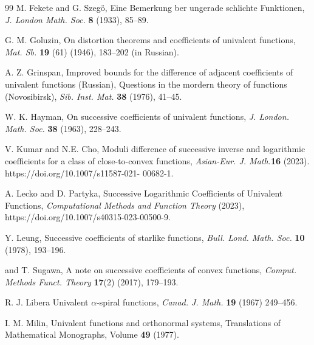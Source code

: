\documentclass[a4paper,12pt]{amsart}
\theoremstyle{definition}
\numberwithin{equation}{section}
\begin{document}
\begin{thebibliography}{99}
 {\sc  M. Fekete} and {\sc G. Szegö},
{Eine Bemerkung ber ungerade schlichte Funktionen},
{\em J. London Math. Soc.} {\bf 8} (1933), 85--89.
	


 {\sc G. M. Goluzin,}
{On distortion theorems and coefficients of univalent functions},
{\em Mat. Sb.} {\bf 19} (61) (1946), 183--202 (in Russian).

 {\sc A. Z. Grinspan,}
{Improved bounds for the difference of adjacent coefficients of univalent functions (Russian), 
	Questions in the mordern theory of functions (Novosibirsk)},
{\em Sib. Inst. Mat.} {\bf 38} (1976), 41--45.

 {\sc W. K. Hayman,}
{On successive coefficients of univalent functions},
{\em J. London. Math. Soc.} {\bf 38} (1963), 228--243.

 {\sc V. Kumar} and {\sc N.E. Cho,}
{Moduli difference of successive inverse and logarithmic coefficients for a class of close-to-convex functions},
{\em Asian-Eur. J. Math.}{\bf 16} (2023). https://doi.org/10.1007/s11587-021-
00682-1.	


{\sc A. Lecko} and {\sc D. Partyka}, { Successive Logarithmic Coefficients of Univalent Functions}, {\em Computational Methods and Function Theory} (2023), https://doi.org/10.1007/s40315-023-00500-9.

 {\sc Y. Leung,}
{Successive coefficients of starlike functions},
{\em Bull. Lond. Math. Soc.} {\bf 10} (1978), 193--196.
	

 and {\sc T. Sugawa},
{A note on successive coefficients of convex functions,}
{\em Comput. Methods Funct. Theory} {\bf 17}(2) (2017), 179--193.


 {\sc R. J. Libera}
{Univalent $\alpha$-spiral functions},
{\em Canad. J. Math.} {\bf 19} (1967) 249--456.
%


	{\sc I. M. Milin}, Univalent functions and orthonormal systems, Translations of Mathematical Monographs, Volume {\bf 49} (1977).
	


\end{thebibliography}
\end{document}
